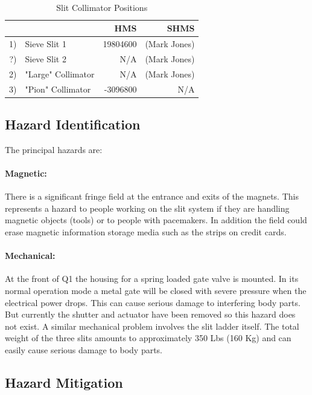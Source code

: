 {\begin{table}[!ht]\
\caption{Slit Collimator Positions\label{tab:col_pos}}
\begin{center}
\begin{tabular}{rlrr}
   	&                  		&     HMS   	& SHMS			\\ \hline
1) 	& Sieve Slit 1   		&  19804600 	&  (Mark Jones)	\\
?) 	& Sieve Slit 2   		&       N/A 		&  (Mark Jones)	\\
2) 	& "Large" Collimator	&       N/A 		&  (Mark Jones)	\\
3) 	& "Pion" Collimator  	&  -3096800	&   N/A			\\
\end{tabular}
\end{center}
\end{table}

   
\subsection{Hazard Identification}

The principal hazards are:
\paragraph{Magnetic:} There is a significant fringe field at
the entrance and exits of the magnets. This represents a hazard
to people working on the slit system if they are handling magnetic
objects (tools) or to people with pacemakers. In addition the field could erase magnetic
information storage media such as the strips on credit cards.
\paragraph{Mechanical:} At the front of Q1 the housing for a spring loaded gate valve is
mounted. In its normal operation mode a metal gate will be closed with
severe pressure when the electrical power drops. This can cause serious
damage to interfering body parts.  But currently the shutter and
actuator have been removed so this hazard does not exist.  
A similar mechanical problem involves the slit ladder itself. The total weight of
the three slits amounts to approximately 350 Lbs (160 Kg) and can easily
cause serious damage to body parts.

\subsection{Hazard Mitigation}

}
